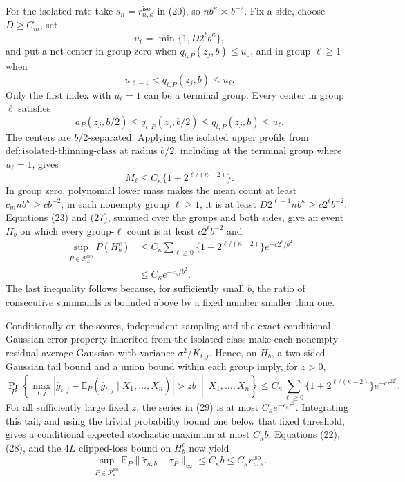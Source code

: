 For the isolated rate take \(s_n=r_{n,\kappa}^{\mathrm{iso}}\) in (20), so \(nb^{\kappa}\asymp b^{-2}\).  Fix a side, choose \(D\ge C_m\), set
\[
 u_\ell=\min\{1,D2^\ell b^{\kappa}\},
\]
and put a net center in group zero when \(q_{t,P}(z_j,b)\le u_0\), and in group \(\ell\ge1\) when
\[
 u_{\ell-1}<q_{t,P}(z_j,b)\le u_\ell.
\]
Only the first index with \(u_\ell=1\) can be a terminal group.  Every center in group \(\ell\) satisfies
\[
 a_P(z_j,b/2)
 \le q_{t,P}(z_j,b/2)
 \le q_{t,P}(z_j,b)
 \le u_\ell.
\]
The centers are \(b/2\)-separated.  Applying the isolated upper profile from \(\mathrm{def:isolated\text{-}thinning\text{-}class}\) at radius \(b/2\), including at the terminal group where \(u_\ell=1\), gives
\[
 M_\ell\le C_{\kappa}\{1+2^{\ell/(\kappa-2)}\}. \tag{27}
\]
In group zero, polynomial lower mass makes the mean count at least \(c_mnb^{\kappa}\ge c b^{-2}\); in each nonempty group \(\ell\ge1\), it is at least \(D2^{\ell-1}nb^{\kappa}\ge c2^\ell b^{-2}\).  Equations (23) and (27), summed over the groups and both sides, give an event \(H_b\) on which every group-\(\ell\) count is at least \(c2^\ell b^{-2}\) and
\[
 \begin{aligned}
 \sup_{P\in\mathcal P_{\kappa}^{\mathrm{iso}}}P(H_b^c)
 &\le C_{\kappa}\sum_{\ell\ge0}
 \{1+2^{\ell/(\kappa-2)}\}e^{-c2^\ell/b^2}\\
 &\le C_{\kappa}e^{-c_{\kappa}/b^2}. 
 \end{aligned} \tag{28}
\]
The last inequality follows because, for sufficiently small \(b\), the ratio of consecutive summands is bounded above by a fixed number smaller than one.

Conditionally on the scores, independent sampling and the exact conditional Gaussian error property inherited from the isolated class make each nonempty residual average Gaussian with variance \(\sigma^2/K_{t,j}\).  Hence, on \(H_b\), a two-sided Gaussian tail bound and a union bound within each group imply, for \(z>0\),
\[
 \Pr_P\left\{
 \max_{t,j}\left|
 \overline g_{t,j}
 -\mathbb E_P(\overline g_{t,j}\mid X_1,\ldots,X_n)
 \right|>zb
 \ \middle|\ X_1,\ldots,X_n\right\}
 \le C_{\kappa}\sum_{\ell\ge0}
 \{1+2^{\ell/(\kappa-2)}\}e^{-c z^22^\ell}. \tag{29}
\]
For all sufficiently large fixed \(z\), the series in (29) is at most \(C_{\kappa}e^{-c_{\kappa}z^2}\).  Integrating this tail, and using the trivial probability bound one below that fixed threshold, gives a conditional expected stochastic maximum at most \(C_{\kappa}b\).  Equations (22), (28), and the \(4L\) clipped-loss bound on \(H_b^c\) now yield
\[
 \sup_{P\in\mathcal P_{\kappa}^{\mathrm{iso}}}
 \mathbb E_P\lVert\widetilde\tau_{n,b}-\tau_P\rVert_{\infty}
 \le C_{\kappa}b
 \le C_{\kappa}r_{n,\kappa}^{\mathrm{iso}}. \tag{30}
\]

